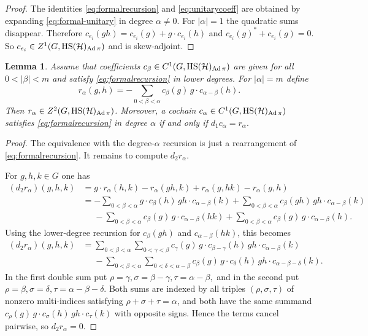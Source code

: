 \documentclass[12pt]{amsproc}
\theoremstyle{plain}
\newtheorem{lemma}[theorem]{Lemma}
\theoremstyle{definition}
\numberwithin{equation}{section}
\newcommand{\HS}{{\rm HS}}
\DeclareMathOperator{\Ad}{Ad}
\begin{document}
\begin{proof}
The identities \eqref{eq:formalrecursion} and \eqref{eq:unitarycoeff} are obtained by expanding \eqref{eq:formal-unitary}
in degree $\alpha\ne 0$.
For $|\alpha|=1$ the quadratic sums disappear. Therefore
$
c_{e_i}(gh)=c_{e_i}(g)+g\cdot c_{e_i}(h)
$
and
$
c_{e_i}(g)^*+c_{e_i}(g)=0.
$
So $c_{e_i}\in Z^1(G,\HS(\mathcal H)_{\Ad\pi})$ and is skew-adjoint.
\end{proof}

\begin{lemma}\label{lem:obstruction}
Assume that coefficients $c_\beta\in C^1(G,\HS(\mathcal H)_{\Ad\pi})$ are given for all $0<|\beta|<m$ and satisfy \eqref{eq:formalrecursion} in lower degrees. For $|\alpha|=m$ define
\[
r_\alpha(g,h)=-\sum_{0<\beta<\alpha}c_\beta(g)\,g\cdot c_{\alpha-\beta}(h).
\]
Then $r_\alpha\in Z^2(G,\HS(\mathcal H)_{\Ad\pi})$. Moreover, a cochain $c_\alpha\in C^1(G,\HS(\mathcal H)_{\Ad\pi} )$ satisfies \eqref{eq:formalrecursion} in degree $\alpha$ if and only if
$
d_1c_\alpha=r_\alpha.
$
\end{lemma}

\begin{proof}
The equivalence with the degree-$\alpha$ recursion is just a rearrangement of \eqref{eq:formalrecursion}. It remains to compute $d_2r_\alpha$.

For $g,h,k\in G$ one has
\begin{align*}
(d_2r_\alpha)(g,h,k)
&=g\cdot r_\alpha(h,k)-r_\alpha(gh,k)+r_\alpha(g,hk)-r_\alpha(g,h)\\
&=-\sum_{0<\beta<\alpha}g\cdot c_\beta(h)\,gh\cdot c_{\alpha-\beta}(k)
+\sum_{0<\beta<\alpha}c_\beta(gh)\,gh\cdot c_{\alpha-\beta}(k)\\
&\phantom{={}}-\sum_{0<\beta<\alpha}c_\beta(g)\,g\cdot c_{\alpha-\beta}(hk)
+\sum_{0<\beta<\alpha}c_\beta(g)\,g\cdot c_{\alpha-\beta}(h).
\end{align*}
Using the lower-degree recursion for $c_\beta(gh)$ and $c_{\alpha-\beta}(hk)$, this becomes
\begin{align*}
(d_2r_\alpha)(g,h,k)
&=\sum_{0<\beta<\alpha}\sum_{0<\gamma<\beta}
c_\gamma(g)\,g\cdot c_{\beta-\gamma}(h)\,gh\cdot c_{\alpha-\beta}(k)\\
&\phantom{={}}-\sum_{0<\beta<\alpha}\sum_{0<\delta<\alpha-\beta}
c_\beta(g)\,g\cdot c_\delta(h)\,gh\cdot c_{\alpha-\beta-\delta}(k).
\end{align*}
In the first double sum put
$
\rho=\gamma,
\sigma=\beta-\gamma,
\tau=\alpha-\beta,
$
and in the second put
$
\rho=\beta,
\sigma=\delta,
\tau=\alpha-\beta-\delta.
$
Both sums are indexed by all triples $(\rho,\sigma,\tau)$ of nonzero multi-indices satisfying $\rho+\sigma+\tau=\alpha$, and both have the same summand
$
c_\rho(g)\,g\cdot c_\sigma(h)\,gh\cdot c_\tau(k)
$
with opposite signs. Hence the terms cancel pairwise, so $d_2r_\alpha=0$.
\end{proof}
\end{document}
